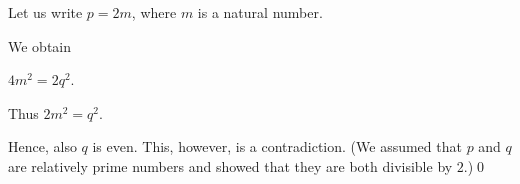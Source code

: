 \documentclass[11pt,paper=b5,footinclude,headinclude]{scrbook} %
\def\ali {{~\vee~}}
\def\inn {{~\wedge~}}
\def\sledi {{~\Rightarrow~}}
\theoremstyle{remark}
\theoremstyle{definition} %
\begin{document}
Let us write $p = 2m$, where $m$ is a natural number.

We obtain

$4m^2 = 2q^2$.

Thus
$2m^2 = q^2$.

Hence, also $q$ is even. This, however, is a contradiction. (We assumed that $p$ and $q$ are relatively prime numbers and showed that they are both divisible by $2$.)\qed

\end{document}
